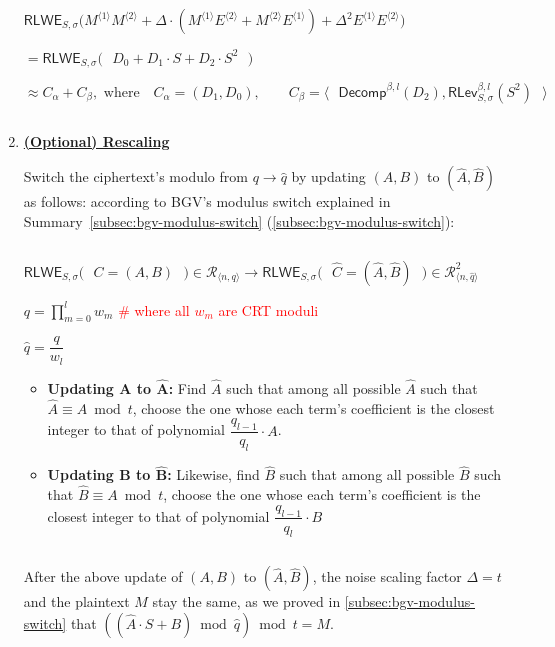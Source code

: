 \begin{tcolorbox}[title={\textbf{\tboxlabel{\ref*{subsec:bgv-mult-cipher}} BGV Ciphertext-to-Ciphertext Multiplication}}]
\begin{enumerate}
$\textsf{RLWE}_{S, \sigma}\bm(M^{\langle 1 \rangle}M^{\langle 2 \rangle} + \Delta\cdot (M^{\langle 1 \rangle}E^{\langle 2 \rangle} + M^{\langle 2 \rangle}E^{\langle 1 \rangle}) + \Delta^2E^{\langle 1 \rangle}E^{\langle 2 \rangle}\bm) $

$= \textsf{RLWE}_{S, \sigma}\bm{(}\text{ }D_0 + D_1\cdot S + D_2\cdot S^2\text{ }\bm{)}$

$  \approx C_\alpha + C_\beta, \text{ where } \text{ } C_\alpha = (D_1, D_0), \text{ }\text{ }\text{ } C_\beta = \bm{\langle}  \text{ } \textsf{Decomp}^{\beta, l}(D_2), \textsf{RLev}_{S, \sigma}^{\beta, l}(S^2)  \text{ } \bm{\rangle}$ 

$ $

\item \textbf{\underline{(Optional) Rescaling}}

Switch the ciphertext's modulo from $q \rightarrow \hat q$ by updating $(A, B)$ to $(\hat A, \hat B)$ as follows: according to BGV's modulus switch explained in Summary~\ref*{subsec:bgv-modulus-switch} (\autoref{subsec:bgv-modulus-switch}):

$ $

$\textsf{RLWE}_{S, \sigma}(\text{ }C = (A, B)\text{ } \bm{)} \in \mathcal{R}_{\langle n, q \rangle} \rightarrow \textsf{RLWE}_{S, \sigma}(\text{ }\hat{C} = (\hat{A}, \hat{B})\text{ } \bm{)} \in \mathcal{R}_{\langle n, \hat q \rangle}^{2}$ 

$q = \prod\limits_{m=0}^{l}w_m$ \textcolor{red}{ \text{ } \# where all $w_m$ are CRT moduli}

$\hat{q} = \dfrac{q}{w_l}$

\begin{itemize}
\item \textbf{Updating $\bm A$ to $\bm{\hat{A}}$:} Find $\hat A$ such that among all possible $\hat A$ such that $\hat A \equiv A \bmod t$, choose the one whose each term's coefficient is the closest integer to that of polynomial $\dfrac{q_{l-1}}{q_l}\cdot A$. 
\item \textbf{Updating $\bm B$ to $\bm{\hat{B}}$:} Likewise, find $\hat B$ such that among all possible $\hat B$ such that $\hat B \equiv A \bmod t$, choose the one whose each term's coefficient is the closest integer to that of polynomial $\dfrac{q_{l-1}}{q_l}\cdot B$
\end{itemize}

$ $

After the above update of $(A, B)$ to $(\hat A, \hat B)$, the noise scaling factor $\Delta = t$ and the plaintext $M$ stay the same, as we proved in \autoref{subsec:bgv-modulus-switch} that $((\hat A \cdot S + B) \bmod \hat q) \bmod t = M$.


\end{enumerate}
\end{tcolorbox}
